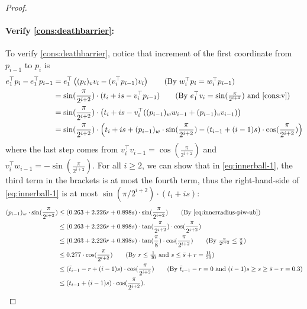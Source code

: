 \documentclass{theoretics}
\begin{document}
\begin{proof}
    \paragraph{Verify \eqref{cons:deathbarrier}:}
    To verify \eqref{cons:deathbarrier}, notice that increment of the first coordinate from $p_{i-1}$ to $p_i$ is
    \begin{align}
        e_1^\top p_i - e_1^\top p_{i-1} &= e_1^\top \left( (p_i)_v v_i - (v_i^\top p_{i-1})v_i  \right) \tag{By $w_i^\top p_i = w_i^\top p_{i-1}$} \nonumber \\
        &= \sin(\frac{\pi}{2^{i + 2}}) \cdot (t_i + is - v_i^\top p_{i-1}) \tag{By $e_1^\top v_i = \sin(\frac{\pi}{2^{i + 2}})$ and \eqref{cons:v}} \nonumber \\
        &= \sin(\frac{\pi}{2^{i + 2}}) \cdot \left(t_i + is - v_i^\top ((p_{i-1})_w w_{i-1} + (p_{i-1})_v v_{i-1}) \right) \nonumber \\
        &= \sin(\frac{\pi}{2^{i + 2}}) \cdot \left(t_i + is + (p_{i-1})_w \cdot \sin(\frac{\pi}{2^{i + 2}}) - (t_{i-1} + (i-1)s) \cdot \cos(\frac{\pi}{2^{i + 2}})  \right)  \label{eq:innerball-1}
    \end{align}
    where the last step comes from $v_i^\top v_{i-1} = \cos(\frac{\pi}{2^{i + 2}})$ and $v_i^\top w_{i-1} = -\sin(\frac{\pi}{2^{i + 2}})$.
    For all $i \geq 2$, we can show that in \eqref{eq:innerball-1}, the third term in the brackets is at most the fourth term, thus the right-hand-side of \eqref{eq:innerball-1} is at most $\sin(\pi/2^{i+2}) \cdot (t_i + is)$:
    \begin{align*}
        (p_{i-1})_w \cdot \sin(\frac{\pi}{2^{i + 2}}) &\leq  (0.263 + 2.226r + 0.898s) \cdot \sin(\frac{\pi}{2^{i+2}}) \tag{By \eqref{eq:innerradius-piw-ub}}\\
        &\leq (0.263 + 2.226r + 0.898s)\cdot \tan(\frac{\pi}{2^{i+2}}) \cdot \cos(\frac{\pi}{2^{i+2}})  \\
        &\leq (0.263 + 2.226r + 0.898s)\cdot \tan(\frac{\pi}{8}) \cdot \cos(\frac{\pi}{2^{i+2}}) \tag{By $\frac{\pi}{2^{i+2}} \leq \frac{\pi}{8}$}  \\
        &\leq 0.277 \cdot \cos(\frac{\pi}{2^{i+2}})  \tag{By $r \leq \frac{1}{30}$ and $s \leq \bar{s} + r = \frac{11}{30}$} \\
        &\leq (\bar{t}_{i-1} - r + (i-1)s)  \cdot \cos(\frac{\pi}{2^{i+2}}) \tag{By $\bar{t}_{i-1}-r = 0$ and $(i-1)s \geq s \geq \bar{s} - r =0.3$}  \\
        &\leq (t_{i-1} + (i-1)s) \cdot \cos(\frac{\pi}{2^{i+2}}).

\end{align*}
\end{proof}
\end{document}
